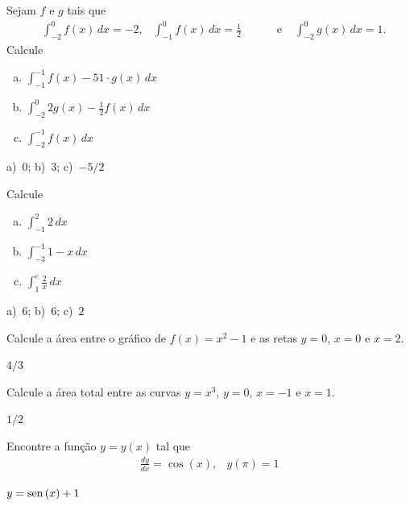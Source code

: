 \cleardoublepage\documentclass[../main.tex]{subfiles}
\begin{document}
\begin{exer}
  Sejam $f$ e $g$ tais que
  \begin{align*}
    &\int_{-2}^{0} f(x)\,dx = -2,& \int_{-1}^{0} f(x)\,dx = \frac{1}{2} &\qquad  \textrm{ e }     & \int_{-2}^0 g(x)\,dx = 1.
  \end{align*}
  Calcule
  \begin{multicols}{2}
  \begin{enumerate}[a)]
  \item $\displaystyle \int_{-1}^{-1} f(x) - 51\cdot g(x)\,dx$
  \item $\displaystyle \int_{-2}^{0} 2g(x) - \frac{1}{2}f(x)\,dx$
  \item $\displaystyle \int_{-2}^{-1} f(x)\,dx$
  \end{enumerate}
  \end{multicols}
\end{exer}

\begin{resp}
  a)~$0$; b)~$3$; c)~$-5/2$
\end{resp}

\begin{exer}
  Calcule
   \begin{multicols}{3}
  \begin{enumerate}[a)]
  \item $\displaystyle\int_{-1}^2 2\,dx$
  \item $\displaystyle\int_{-3}^{-1} 1-x\,dx$
  \item $\displaystyle\int_{1}^{e} \frac{2}{x}\,dx$
  \end{enumerate}
  \end{multicols}
\end{exer}
\begin{resp}
  a)~$6$; b)~$6$; c)~$2$
\end{resp}

\begin{exer}
  Calcule a área entre o gráfico de $f(x) = x^2-1$ e as retas $y=0$, $x=0$ e $x=2$.
\end{exer}
\begin{resp}
  $4/3$
\end{resp}
\begin{exer}
  Calcule a área total entre as curvas $y=x^3$, $y=0$, $x=-1$ e $x=1$.
\end{exer}
\begin{resp}
  $1/2$
\end{resp}
\begin{exer}
  Encontre a função $y = y(x)$ tal que
  \begin{align*}
    \frac{dy}{dx} = \cos(x), & y(\pi) = 1
  \end{align*}
 \end{exer}
\begin{resp}
  $y = \operatorname{sen}\,(x) + 1$
\end{resp}
\end{document}
